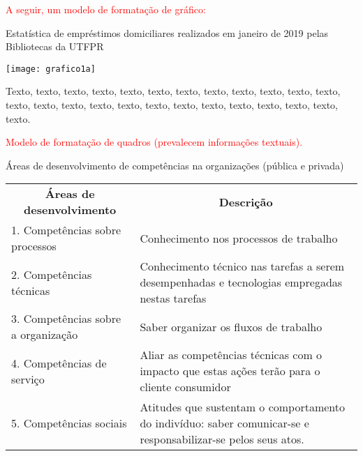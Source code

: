  \textcolor{red}{A seguir, um modelo de formatação de gráfico:}

 \newpage

 \begin{graph}[!htb]%
      \caption{Estatística de empréstimos domiciliares realizados em janeiro de 2019 pelas Bibliotecas da UTFPR}%
      \label{fig:grap1}%
      \texttt{[image: grafico1a]}%
  \end{graph}

Texto, texto, texto, texto, texto, texto, texto, texto, texto, texto, texto, texto, texto, texto, texto, texto, texto, texto, texto, texto, texto, texto, texto, texto, texto.

\textcolor{red}{Modelo de formatação de quadros (prevalecem informações textuais).}

\begin{tabframed}[htb]%
 \caption{Áreas de desenvolvimento de competências na organizações (pública e privada)}%
 \label{quad:exemplo1}%
 \renewcommand{\arraystretch}{1.5}
 \begin{tabular}{|l|p{9cm}|}
 \cline{1-2}
 \multicolumn{1}{|c|}{\textbf{Áreas de desenvolvimento}} & \multicolumn{1}{|c|}{\textbf{\centering Descrição}}\\ \cline{1-2}
  1. Competências sobre processos & Conhecimento nos processos de trabalho \\ \cline{1-2}  
  2. Competências técnicas & Conhecimento técnico nas tarefas a serem desempenhadas e tecnologias empregadas nestas tarefas \\ \cline{1-2}  
  3. Competências sobre a organização & Saber organizar os fluxos de trabalho \\ \cline{1-2}
  4. Competências de serviço & Aliar as competências técnicas com o impacto que estas ações terão para o cliente consumidor \\ \cline{1-2}
  5. Competências sociais & Atitudes que sustentam o comportamento do indivíduo: saber comunicar-se e responsabilizar-se pelos seus atos.\\ \cline{1-2}
 \end{tabular}
 \end{tabframed}


